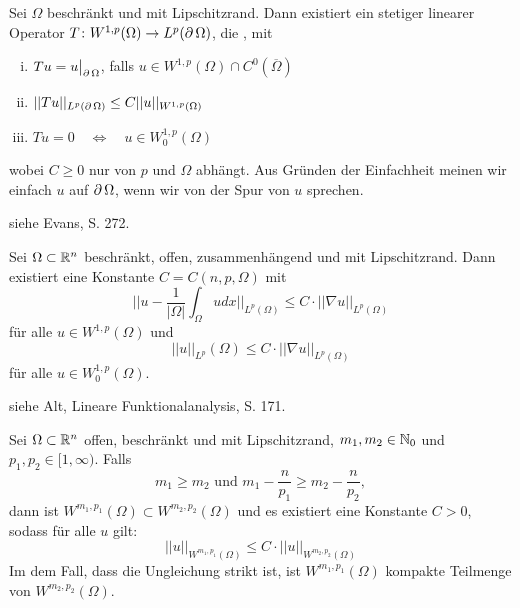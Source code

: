 \begin{thm}[Spursatz] \label{thm:spursatz} \label{thm_60}
	Sei $\Omega$ beschränkt und mit Lipschitzrand.\marginnote{[60]} Dann existiert ein stetiger linearer Operator $T\colon W^{1,p}(\Omega) \rightarrow L^p(\operatorname{\partial} \Omega)$, die , mit
	\begin{enumerate}[(i)]
		\item $Tu = u \big|_{\operatorname{\partial} \Omega}$, falls $u \in W^{1,p}(\Omega) \cap C^0(\overline{\Omega})$
		\item $||Tu||_{L^p(\operatorname{\partial} \Omega)} \leq C||u||_{W^{1,p}(\Omega)}$
		\item $Tu=0 \quad \Leftrightarrow \quad u \in W_0^{1,p}(\Omega)$
	\end{enumerate}
	wobei $C \geq 0$ nur von $p$ und $\Omega$ abhängt. Aus Gründen der Einfachheit meinen wir einfach  $u$ auf $\operatorname{\partial} \Omega$, wenn wir von der Spur von $u$ sprechen.
\end{thm}
	
	siehe Evans, S. 272.
	
\begin{thm} \label{thm:poincare_ungl} \label{thm_61}
	Sei $\Omega \subset \mathbb{R}^n$ beschränkt, offen, \marginnote{[61]} zusammenhängend und mit Lipschitzrand. Dann existiert eine Konstante $C = C(n,p,\Omega)$ mit 
	\[ ||u- \frac{1}{|\Omega|} \int_{\Omega} u dx||_{L^p(\Omega)} \leq C \cdot ||\nabla u||_{L^p(\Omega)} \]
	für alle $u \in W^{1,p}(\Omega)$ und
	\[ ||u||_{L^p}(\Omega) \leq C \cdot ||\nabla u||_{L^p(\Omega)} \]
	für alle $u \in W_0^{1,p}(\Omega)$. 
\end{thm}
	
	siehe Alt, \glqq Lineare Funktionalanalysis\grqq, S. 171.
	
\begin{thm} \label{thm:sobolev_einbettung} \label{thm_62}
	Sei $\Omega \subset \mathbb{R}^n$ offen, beschränkt und mit Lipschitzrand, $m_1,m_2 \in \mathbb{N}_0$ und $p_1,p_2 \in [1,\infty)$. Falls \marginnote{[62]}
	\[ m_1 \geq m_2 \text{ und } m_1 - \frac{n}{p_1} \geq m_2 - \frac{n}{p_2}, \]
	dann ist $W^{m_1,p_1}(\Omega) \subset W^{m_2,p_2}(\Omega)$ und es existiert eine Konstante $C > 0$, sodass für alle $u$ gilt:
	\[ ||u||_{W^{m_1,p_1}(\Omega)} \leq C \cdot ||u||_{W^{m_2,p_2}(\Omega)} \]
	Im dem Fall, dass die Ungleichung strikt ist, ist $W^{m_1,p_1}(\Omega)$ kompakte Teilmenge von $W^{m_2,p_2}(\Omega)$.
\end{thm}
	
